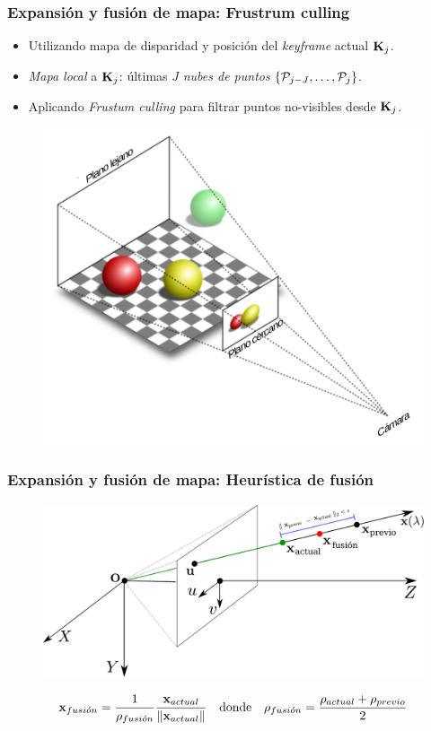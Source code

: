 \documentclass[compress]{beamer}
\begin{document}
\begin{frame}
	\frametitle{Expansión y fusión de mapa: Frustrum culling}
	
	\begin{itemize}
		\item Utilizando mapa de disparidad y posición del \emph{keyframe} actual $\boldsymbol{\mathbf{K}}_{j}$.
		\item \emph{Mapa local} a $\boldsymbol{\mathbf{K}}_{j}$: últimas $J$ \emph{nubes de puntos} $\left\{ \mathcal P_{j-J},\hdots,\mathcal P_{j}\right\}$.
		\item Aplicando \emph{Frustum culling} para filtrar puntos no-visibles desde $\boldsymbol{\mathbf{K}}_{j}$.
	\end{itemize}
	
	\begin{figure}[htb]
		\centering
		\includegraphics[width=0.6\columnwidth]{method/frustum_culling.pdf}
	\end{figure}

\end{frame}


\begin{frame}
	\frametitle{Expansión y fusión de mapa: Heurística de fusión}
	\begin{figure}[htb]
		\centering
		\includegraphics[width=\columnwidth]{method/metodo-fusion-spa.pdf}
	\end{figure}
	\begin{equation*}
		\boldsymbol{\mathbf{x}}_{fusi\acute{o}n}=\frac{1}{\rho_{fusi\acute{o}n}}\frac{\boldsymbol{\mathbf{x}}_{actual}}{\left\lVert\boldsymbol{\mathbf{x}}_{actual}\right\rVert}
		\quad \text{donde} \quad 
		\rho_{fusi\acute{o}n}=\frac{\rho_{actual}+\rho_{previo}}{2}
	\end{equation*}
\end{frame}
\end{document}
